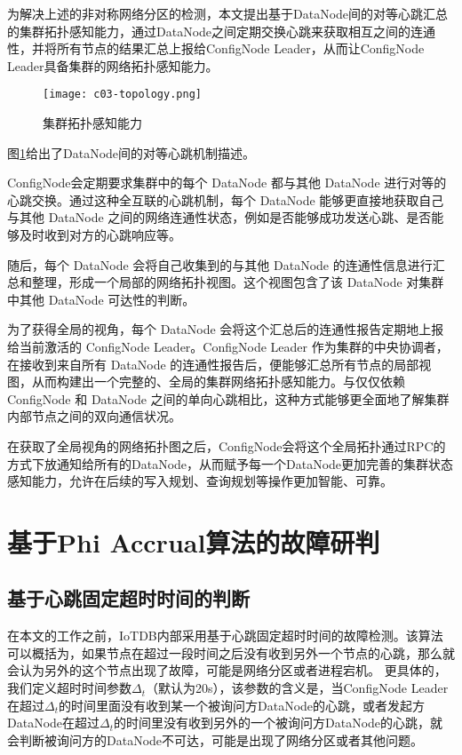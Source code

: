 为解决上述的非对称网络分区的检测，本文提出基于DataNode间的对等心跳汇总的集群拓扑感知能力，通过DataNode之间定期交换心跳来获取相互之间的连通性，并将所有节点的结果汇总上报给ConfigNode Leader，从而让ConfigNode Leader具备集群的网络拓扑感知能力。

\begin{figure}
  \centering
  \texttt{[image: c03-topology.png]}
  \caption{集群拓扑感知能力}
  \label{fig:c03-topology}
\end{figure}

图\ref{fig:c03-topology}给出了DataNode间的对等心跳机制描述。

ConfigNode会定期要求集群中的每个 DataNode 都与其他 DataNode 进行对等的心跳交换。通过这种全互联的心跳机制，每个 DataNode 能够更直接地获取自己与其他 DataNode 之间的网络连通性状态，例如是否能够成功发送心跳、是否能够及时收到对方的心跳响应等。

随后，每个 DataNode 会将自己收集到的与其他 DataNode 的连通性信息进行汇总和整理，形成一个局部的网络拓扑视图。这个视图包含了该 DataNode 对集群中其他 DataNode 可达性的判断。

为了获得全局的视角，每个 DataNode 会将这个汇总后的连通性报告定期地上报给当前激活的 ConfigNode Leader。ConfigNode Leader 作为集群的中央协调者，在接收到来自所有 DataNode 的连通性报告后，便能够汇总所有节点的局部视图，从而构建出一个完整的、全局的集群网络拓扑感知能力。与仅仅依赖 ConfigNode 和 DataNode 之间的单向心跳相比，这种方式能够更全面地了解集群内部节点之间的双向通信状况。

在获取了全局视角的网络拓扑图之后，ConfigNode会将这个全局拓扑通过RPC的方式下放通知给所有的DataNode，从而赋予每一个DataNode更加完善的集群状态感知能力，允许在后续的写入规划、查询规划等操作更加智能、可靠。


\section{基于Phi Accrual算法的故障研判}\label{failure_detection}

\subsection{基于心跳固定超时时间的判断}\label{failure_detection_timeout_fix}

在本文的工作之前，IoTDB内部采用基于心跳固定超时时间的故障检测。该算法可以概括为，如果节点在超过一段时间之后没有收到另外一个节点的心跳，那么就会认为另外的这个节点出现了故障，可能是网络分区或者进程宕机。
更具体的，我们定义超时时间参数$\Delta_{t}$（默认为20s），该参数的含义是，当ConfigNode Leader在超过$\Delta_{t}$的时间里面没有收到某一个被询问方DataNode的心跳，或者发起方DataNode在超过$\Delta_{t}$的时间里没有收到另外的一个被询问方DataNode的心跳，就会判断被询问方的DataNode不可达，可能是出现了网络分区或者其他问题。

